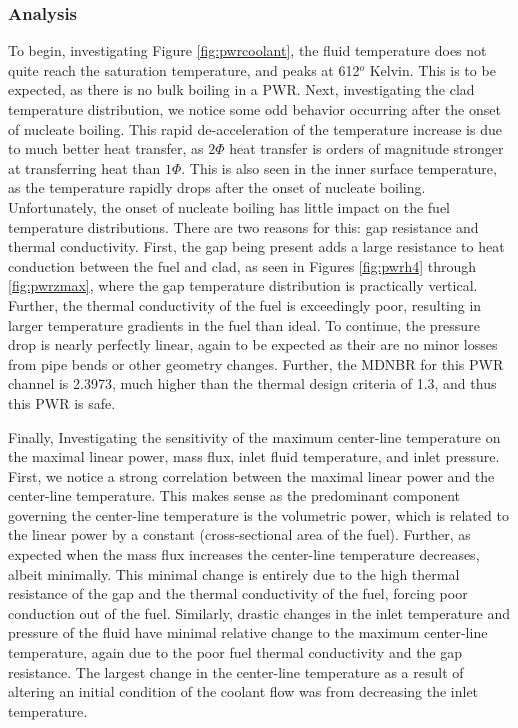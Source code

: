 \documentclass{article}
\begin{document}
\clearpage
\subsubsection{Analysis}
To begin, investigating Figure \ref{fig:pwrcoolant}, the fluid temperature does not quite reach the saturation temperature, and peaks at 612$^o$ Kelvin. This is to be expected, as there is no bulk boiling in a PWR. Next, investigating the clad temperature distribution, we notice some odd behavior occurring after the onset of nucleate boiling. This rapid de-acceleration of the temperature increase is due to much better heat transfer, as $2\Phi$ heat transfer is orders of magnitude stronger at transferring heat than $1\Phi$. This is also seen in the inner surface temperature, as the temperature rapidly drops after the onset of nucleate boiling. Unfortunately, the onset of nucleate boiling has little impact on the fuel temperature distributions. There are two reasons for this: gap resistance and thermal conductivity. First, the gap being present adds a large resistance to heat conduction between the fuel and clad, as seen in Figures \ref{fig:pwrh4} through \ref{fig:pwrzmax}, where the gap temperature distribution is practically vertical. Further, the thermal conductivity of the fuel is exceedingly poor, resulting in larger temperature gradients in the fuel than ideal. To continue, the pressure drop is nearly perfectly linear, again to be expected as their are no minor losses from pipe bends or other geometry changes. Further, the MDNBR for this PWR channel is 2.3973, much higher than the thermal design criteria of 1.3, and thus this PWR is safe. 

Finally, Investigating the sensitivity of the maximum center-line temperature on the maximal linear power, mass flux, inlet fluid temperature, and inlet pressure. First, we notice a strong correlation between the maximal linear power and the center-line temperature. This makes sense as the predominant component governing the center-line temperature is the volumetric power, which is related to the linear power by a constant (cross-sectional area of the fuel). Further, as expected when the mass flux increases the center-line temperature decreases, albeit minimally. This minimal change is entirely due to the high thermal resistance of the gap and the thermal conductivity of the fuel, forcing poor conduction out of the fuel. Similarly, drastic changes in the inlet temperature and pressure of the fluid have minimal relative change to the maximum center-line temperature, again due to the poor fuel thermal conductivity and the gap resistance. The largest change in the center-line temperature as a result of altering an initial condition of the coolant flow was from decreasing the inlet temperature.
\end{document}
